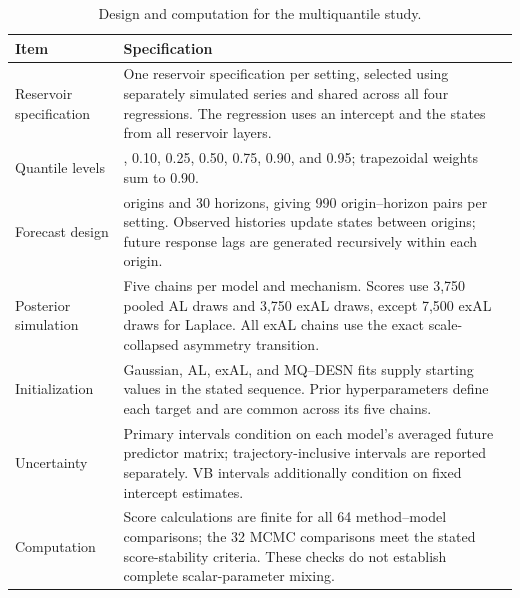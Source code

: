 \begin{table}[!htbp]
\centering
\scriptsize
\setlength{\tabcolsep}{3pt}
\renewcommand{\arraystretch}{1.08}
\begin{tabular}{@{}>{\raggedright\arraybackslash}p{}>{\raggedright\arraybackslash}p{}@{}}
\toprule
Item & Specification \\
\midrule
Reservoir specification & One reservoir specification per setting, selected using separately simulated series and shared across all four regressions. The regression uses an intercept and the states from all reservoir layers. \\
Quantile levels & 0.05, 0.10, 0.25, 0.50, 0.75, 0.90, and 0.95; trapezoidal weights sum to 0.90. \\
Forecast design & 33 origins and 30 horizons, giving 990 origin--horizon pairs per setting. Observed histories update states between origins; future response lags are generated recursively within each origin. \\
Posterior simulation & Five chains per model and mechanism. Scores use 3,750 pooled AL draws and 3,750 exAL draws, except 7,500 exAL draws for Laplace. All exAL chains use the exact scale-collapsed asymmetry transition. \\
Initialization & Gaussian, AL, exAL, and MQ--DESN fits supply starting values in the stated sequence. Prior hyperparameters define each target and are common across its five chains. \\
Uncertainty & Primary intervals condition on each model's averaged future predictor matrix; trajectory-inclusive intervals are reported separately. VB intervals additionally condition on fixed intercept estimates. \\
Computation & Score calculations are finite for all 64 method--model comparisons; the 32 MCMC comparisons meet the stated score-stability criteria. These checks do not establish complete scalar-parameter mixing. \\
\bottomrule
\end{tabular}
\caption{Design and computation for the multiquantile study.}
\label{qdesn2026:tab:joint-qdesn-pure-desn-v2-protocol}
\end{table}

